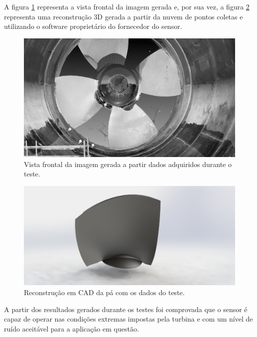 A figura \ref{fig::turbina_faro} representa a vista frontal da imagem gerada e, por sua
vez, a figura \ref{fig::turbina_cad} representa uma reconstrução 3D gerada a
partir da nuvem de pontos coletas e utilizando o software proprietário do
fornecedor do sensor. 

\begin{figure}[h!]
\centering
	\includegraphics[width=0.9\columnwidth]{figs/3dsensors/recorte_video}
	\caption{Vista frontal da imagem gerada a partir dados adquiridos durante o
	teste.}
	\label{fig::turbina_faro}
\end{figure}

\begin{figure}[h!]
\centering
	\includegraphics[width=0.9\columnwidth]{figs/3dsensors/Pa_Real_Render_04}
	\caption{Reconstrução em CAD da pá com os dados do teste.}
	\label{fig::turbina_cad}
\end{figure}

A partir dos resultados gerados durante os testes foi comprovada que o sensor é
capaz de operar nas condições extremas impostas pela turbina e com um nível de
ruído aceitável para a aplicação em questão. 